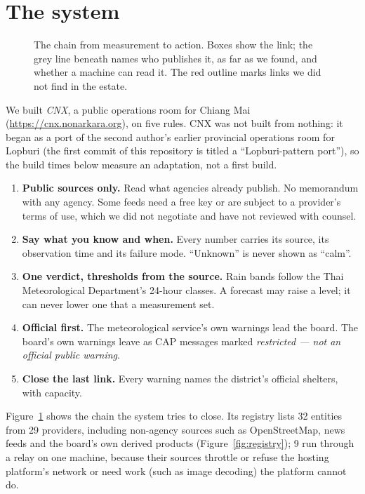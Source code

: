\documentclass[10pt,twocolumn,a4paper]{article}
\newcommand{\kw}[1]{\textbf{#1}}
\begin{document}
\section{The system}
\label{sec:system}
\begin{figure}[!t]
\centering
\resizebox{\textwidth}{!}{}
\caption{The chain from measurement to action. Boxes show the link; the grey line beneath names who publishes it, as far as we found, and whether a machine can read it. The red outline marks links we did not find in the estate.}\label{fig:chain}
\end{figure}
We built \emph{CNX}, a public operations room for Chiang Mai (\url{https://cnx.nonarkara.org}), on five rules. CNX was not built from nothing: it began as a port of the second author\textquoteright s earlier provincial operations room for Lopburi (the first commit of this repository is titled a ``Lopburi-pattern port''), so the build times below measure an adaptation, not a first build.
\begin{enumerate}
\item \kw{Public sources only.} Read what agencies already publish. No memorandum with any agency. Some feeds need a free key or are subject to a provider\textquoteright s terms of use, which we did not negotiate and have not reviewed with counsel.
\item \kw{Say what you know and when.} Every number carries its source, its observation time and its failure mode. ``Unknown'' is never shown as ``calm''.
\item \kw{One verdict, thresholds from the source.} Rain bands follow the Thai Meteorological Department's 24-hour classes. A forecast may raise a level; it can never lower one that a measurement set.
\item \kw{Official first.} The meteorological service's own warnings lead the board. The board's own warnings leave as CAP messages marked \emph{restricted --- not an official public warning}.
\item \kw{Close the last link.} Every warning names the district's official shelters, with capacity.
\end{enumerate}
\noindent Figure~\ref{fig:chain} shows the chain the system tries to close. Its registry lists 32 entities from 29 providers, including non-agency sources such as OpenStreetMap, news feeds and the board\textquoteright s own derived products (Figure~\ref{fig:registry}); 9 run through a relay on one machine, because their sources throttle or refuse the hosting platform's network or need work (such as image decoding) the platform cannot do.
\end{document}
